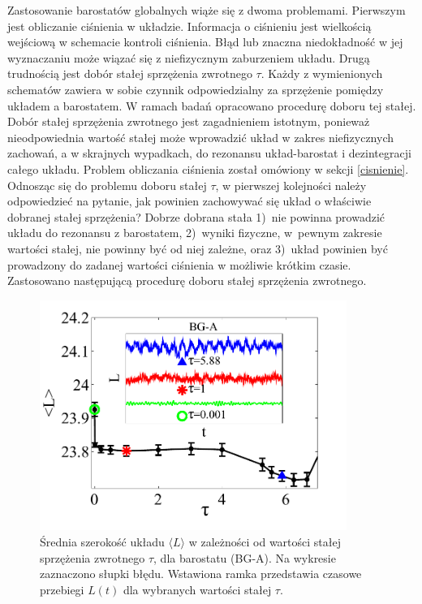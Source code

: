 \documentclass[12pt,a4paper,openright]{report} %
\begin{document}
Zastosowanie barostatów globalnych wiąże się z dwoma problemami.
Pierwszym jest obliczanie ciśnienia w układzie. Informacja o ciśnieniu jest wielkością wejściową w schemacie kontroli ciśnienia. Błąd lub znaczna niedokładność w jej wyznaczaniu może wiązać się z niefizycznym zaburzeniem układu. 
%
Drugą trudnością jest dobór stałej sprzężenia zwrotnego $\tau$. Każdy z wymienionych schematów zawiera w sobie czynnik odpowiedzialny za sprzężenie pomiędzy układem a barostatem. W ramach badań opracowano procedurę doboru tej stałej. Dobór stałej sprzężenia zwrotnego jest zagadnieniem istotnym, ponieważ nieodpowiednia wartość stałej może wprowadzić układ w zakres niefizycznych zachowań, a w skrajnych wypadkach, do rezonansu układ-barostat i dezintegracji całego układu. 
%
Problem obliczania ciśnienia został omówiony w sekcji \ref{cisnienie}. 
Odnosząc się do problemu doboru stałej $\tau$, w pierwszej kolejności należy odpowiedzieć na pytanie, jak powinien zachowywać się układ o właściwie dobranej stałej sprzężenia? Dobrze dobrana stała 1)~nie powinna prowadzić układu do rezonansu z barostatem, 2)~wyniki fizyczne, w~pewnym zakresie wartości stałej, nie powinny być od niej zależne, oraz 3)~układ powinien być prowadzony do zadanej wartości ciśnienia w możliwie krótkim czasie. Zastosowano następującą procedurę doboru stałej sprzężenia zwrotnego.%
\begin{figure}
\centering
\includegraphics[width=100mm]{rysunki/BG-A.pdf}
\caption{Średnia szerokość układu $\langle L \rangle$ w zależności od wartości stałej sprzężenia zwrotnego $\tau$, dla barostatu (BG-A). Na wykresie zaznaczono słupki błędu. Wstawiona ramka przedstawia czasowe przebiegi $L(t)$ dla wybranych wartości stałej $\tau$.}
\label{wykBG-A}
\end{figure}
\end{document}
